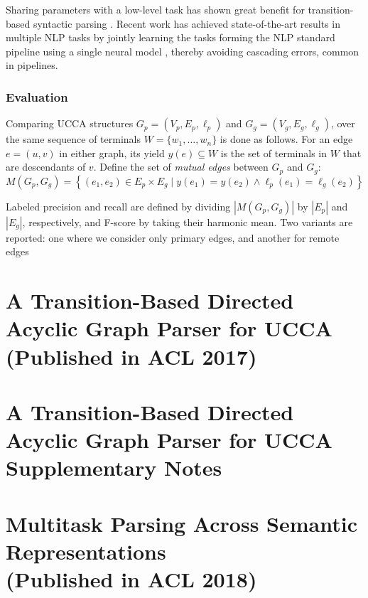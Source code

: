 \documentclass[12pt,a4paper]{report}
\begin{document}
Sharing parameters with a low-level task
has shown great benefit for transition-based syntactic parsing
\citep{bohnet2012transition,Zhang2016StackpropagationIR,constant-nivre:2016:P16-1,more2016joint}.
Recent work has achieved state-of-the-art results in multiple NLP tasks
by jointly learning the tasks forming the NLP standard pipeline using 
a single neural model \citep{collobert2011natural,D17-1206},
thereby avoiding cascading errors, common in pipelines.


\subsection*{Evaluation}
Comparing UCCA structures
$G_p=(V_p,E_p,\ell_p)$ and $G_g=(V_g,E_g,\ell_g)$,
over the same sequence of terminals $W = \{w_1,\ldots,w_n\}$
is done as follows.
For an edge $e=(u,v)$ in either graph, its yield $y(e) \subseteq W$ is the
set of terminals in $W$ that are descendants of $v$.
Define the set of \textit{mutual edges} between $G_p$ and $G_g$:
\[
    M(G_p,G_g) =
    \left\{(e_1,e_2) \in E_p \times E_g \;|\;
    y(e_1) = y(e_2) \wedge \ell_p(e_1)=\ell_g(e_2)\right\}
\]

Labeled precision and recall are defined by dividing $|M(G_p,G_g)|$ by $|E_p|$ and $|E_g|$, respectively,
and F-score by taking their harmonic mean.
Two variants are reported: one where we consider only primary edges,
and another for remote edges



\chapter{A Transition-Based Directed Acyclic Graph Parser for UCCA \\ (Published in ACL 2017)}



\chapter*{A Transition-Based Directed Acyclic Graph Parser for UCCA \\ Supplementary Notes}



\chapter{Multitask Parsing Across Semantic Representations \\ (Published in ACL 2018)}
\end{document}
